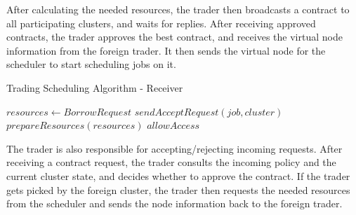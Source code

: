 After calculating the needed resources, the trader then broadcasts a contract
to all participating clusters, and waits for replies. After receiving approved
contracts, the trader approves the best contract, and receives the virtual node
information from the foreign trader. It then sends the virtual node for the
scheduler to start scheduling jobs on it.

\begin{algorithm}[H]
    \caption{Trading Scheduling Algorithm - Receiver}
    \begin{algorithmic}
            \State $ resources \gets BorrowRequest $  
            \State $sendAcceptRequest(job, cluster)$
            \State $prepareResources(resources)$
            \State $allowAccess$
            \EndIf
    \end{algorithmic}
\end{algorithm} 

The trader is also responsible for accepting/rejecting incoming requests. After
receiving a contract request, the trader consults the incoming policy and the
current cluster state, and decides whether to approve the contract. If the
trader gets picked by the foreign cluster, the trader then requests the needed
resources from the scheduler and sends the node information back to the foreign
trader.

